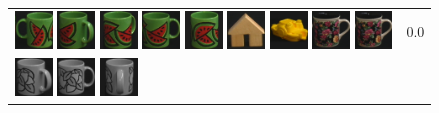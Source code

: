 \begin{figure}[tbp]
\begin{center}
\begin{tabular}{m{11cm} | m{3cm} |}
\includegraphics[width=1cm]{coil/beeld-31.eps}
\includegraphics[width=1cm]{coil/beeld-34.eps}
\includegraphics[width=1cm]{coil/beeld-33.eps}
\includegraphics[width=1cm]{coil/beeld-30.eps}
\includegraphics[width=1cm]{coil/beeld-32.eps}
\includegraphics[width=1cm]{coil/beeld-42.eps}
\includegraphics[width=1cm]{coil/beeld-16.eps}
\includegraphics[width=1cm]{coil/beeld-60.eps}
\includegraphics[width=1cm]{coil/beeld-60.eps}
& {\scriptsize 0.0}
\\
\includegraphics[width=1cm]{coil/beeld-49.eps}
\includegraphics[width=1cm]{coil/beeld-48.eps}
\includegraphics[width=1cm]{coil/beeld-50.eps}

\end{tabular}
\end{center}
\end{figure}
